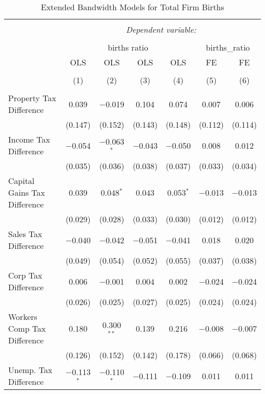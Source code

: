 
\begin{table}[!htbp] \centering 
  \caption{Extended Bandwidth Models for  Total Firm Births} 
  \label{--eb} 
\begin{tabular}{@{\extracolsep{5pt}}lcccccc} 
\\[-1.8ex]\hline 
\hline \\[-1.8ex] 
 & \multicolumn{6}{c}{\textit{Dependent variable:}} \\ 
\cline{2-7} 
\\[-1.8ex] & \multicolumn{4}{c}{births ratio} & \multicolumn{2}{c}{births\_ratio} \\ 
 & OLS & OLS & OLS & OLS & FE & FE \\ 
\\[-1.8ex] & (1) & (2) & (3) & (4) & (5) & (6)\\ 
\hline \\[-1.8ex] 
 Property Tax Difference & 0.039 & $-$0.019 & 0.104 & 0.074 & 0.007 & 0.006 \\ 
  & (0.147) & (0.152) & (0.143) & (0.148) & (0.112) & (0.114) \\ 
  Income Tax Difference & $-$0.054 & $-$0.063$^{*}$ & $-$0.043 & $-$0.050 & 0.008 & 0.012 \\ 
  & (0.035) & (0.036) & (0.038) & (0.037) & (0.033) & (0.034) \\ 
  Capital Gains Tax Difference & 0.039 & 0.048$^{*}$ & 0.043 & 0.053$^{*}$ & $-$0.013 & $-$0.013 \\ 
  & (0.029) & (0.028) & (0.033) & (0.030) & (0.012) & (0.012) \\ 
  Sales Tax Difference & $-$0.040 & $-$0.042 & $-$0.051 & $-$0.041 & 0.018 & 0.020 \\ 
  & (0.049) & (0.054) & (0.052) & (0.055) & (0.037) & (0.038) \\ 
  Corp Tax Difference & 0.006 & $-$0.001 & 0.004 & 0.002 & $-$0.024 & $-$0.024 \\ 
  & (0.026) & (0.025) & (0.027) & (0.025) & (0.024) & (0.024) \\ 
  Workers Comp Tax Difference & 0.180 & 0.300$^{**}$ & 0.139 & 0.216 & $-$0.008 & $-$0.007 \\ 
  & (0.126) & (0.152) & (0.142) & (0.178) & (0.066) & (0.068) \\ 
  Unemp. Tax Difference & $-$0.113$^{*}$ & $-$0.110$^{*}$ & $-$0.111 & $-$0.109 & 0.011 & 0.011 \\ 

\end{tabular}
\end{table}
